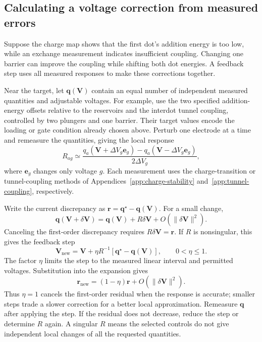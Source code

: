 \subsection{Calculating a voltage correction from measured errors}

Suppose the charge map shows that the first dot's addition energy
is too low, while an exchange measurement indicates insufficient
coupling. Changing one barrier can improve the coupling while
shifting both dot energies. A feedback step uses all measured
responses to make these corrections together.

Near the target, let $\mathbf q(\mathbf V)$ contain an equal
number of independent measured quantities and adjustable voltages.
For example, use the two specified addition-energy offsets relative
to the reservoirs and the interdot tunnel coupling, controlled by
two plungers and one barrier. Their target values encode the
loading or gate condition already chosen above.
Perturb one electrode at a time and remeasure the quantities,
giving the local response
\begin{equation}
 R_{ag}\simeq
 \frac{q_a(\mathbf V+\Delta V_g\mathbf e_g)
       -q_a(\mathbf V-\Delta V_g\mathbf e_g)}
      {2\Delta V_g},
 \label{eq:calibration-feedback-response}
\end{equation}
where $\mathbf e_g$ changes only voltage $g$. Each measurement
uses the charge-transition or tunnel-coupling methods of
Appendices~\ref{app:charge-stability}
and~\ref{app:tunnel-coupling}, respectively.

Write the current discrepancy as
$\mathbf r=\mathbf q^\star-\mathbf q(\mathbf V)$.
For a small change,
\[
 \mathbf q(\mathbf V+\delta\mathbf V)
 =\mathbf q(\mathbf V)+R\delta\mathbf V
                  +O(\|\delta\mathbf V\|^2).
\]
Canceling the first-order discrepancy requires
$R\delta\mathbf V=\mathbf r$. If $R$ is nonsingular, this gives
the feedback step
\begin{equation}
 \mathbf V_{\mathrm{new}}
 =\mathbf V+\eta R^{-1}
          [\mathbf q^\star-\mathbf q(\mathbf V)],
 \qquad 0<\eta\le1.
 \label{eq:calibration-feedback-update}
\end{equation}
The factor $\eta$ limits the step to the measured linear interval
and permitted voltages. Substitution into the expansion gives
\[
 \mathbf r_{\mathrm{new}}
 =(1-\eta)\mathbf r+O(\|\delta\mathbf V\|^2).
\]
Thus $\eta=1$ cancels the first-order residual when the response is
accurate; smaller steps trade a slower correction for a better local
approximation. Remeasure $\mathbf q$ after applying the step.
If the residual does not decrease, reduce the step or determine
$R$ again. A singular $R$ means the selected controls do not give
independent local changes of all the requested quantities.

